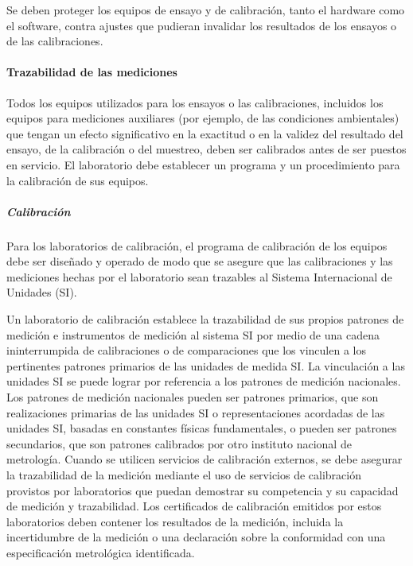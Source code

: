 			\par \noindent
				Se deben proteger los equipos de ensayo y de calibración, tanto el hardware como el software,
				contra ajustes que pudieran invalidar los resultados de los ensayos o de las calibraciones.
				
\newpage
\thispagestyle{plain}

		\paragraph{Trazabilidad de las mediciones}
			\par 
				Todos los equipos utilizados para los ensayos o las calibraciones, incluidos los equipos para mediciones
				auxiliares (por ejemplo, de las condiciones ambientales) que tengan un efecto significativo en la exactitud o
				en la validez del resultado del ensayo, de la calibración o del muestreo, deben ser calibrados antes de ser
				puestos en servicio. El laboratorio debe establecer un programa y un procedimiento para la calibración de sus
				equipos.
				
			\subparagraph{Calibración}
				\par 
					Para los laboratorios de calibración, el programa de calibración de los equipos debe ser diseñado
					y operado de modo que se asegure que las calibraciones y las mediciones hechas por el laboratorio sean
					trazables al Sistema Internacional de Unidades (SI).
				\par \noindent
					Un laboratorio de calibración establece la trazabilidad de sus propios patrones de medición e instrumentos de
					medición al sistema SI por medio de una cadena ininterrumpida de calibraciones o de comparaciones que los
					vinculen a los pertinentes patrones primarios de las unidades de medida SI. La vinculación a las unidades SI se
					puede lograr por referencia a los patrones de medición nacionales. Los patrones de medición nacionales
					pueden ser patrones primarios, que son realizaciones primarias de las unidades SI o representaciones
					acordadas de las unidades SI, basadas en constantes físicas fundamentales, o pueden ser patrones
					secundarios, que son patrones calibrados por otro instituto nacional de metrología. Cuando se utilicen servicios
					de calibración externos, se debe asegurar la trazabilidad de la medición mediante el uso de servicios de
					calibración provistos por laboratorios que puedan demostrar su competencia y su capacidad de medición y
					trazabilidad. Los certificados de calibración emitidos por estos laboratorios deben contener los resultados de la
					medición, incluida la incertidumbre de la medición o una declaración sobre la conformidad con una
					especificación metrológica identificada.
					
